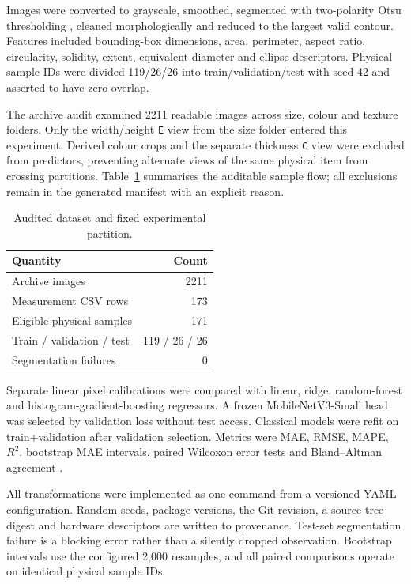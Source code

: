 \documentclass[10pt,twocolumn]{article}
\begin{document}
Images were converted to grayscale, smoothed, segmented with two-polarity Otsu thresholding
\cite{otsu1979threshold}, cleaned morphologically and reduced to the largest valid contour.
Features included bounding-box dimensions, area, perimeter, aspect ratio, circularity, solidity,
extent, equivalent diameter and ellipse descriptors. Physical sample IDs were divided
119/26/26
into train/validation/test with seed 42 and asserted to have zero overlap.

The archive audit examined 2211 readable images across size, colour and texture folders.
Only the width/height \texttt{E} view from the size folder entered this experiment. Derived
colour crops and the separate thickness \texttt{C} view were excluded from predictors,
preventing alternate views of the same physical item from crossing partitions.
Table~\ref{tab:data} summarises the auditable
sample flow; all exclusions remain in the generated manifest with an explicit reason.

\begin{table}[h]
\centering
\caption{Audited dataset and fixed experimental partition.}
\label{tab:data}
\begin{tabular}{lr}
\toprule Quantity & Count \\
\midrule Archive images & 2211 \\
Measurement CSV rows & 173 \\
Eligible physical samples & 171 \\
Train / validation / test & 119 / 26 / 26 \\
Segmentation failures & 0 \\
\bottomrule
\end{tabular}
\end{table}

Separate linear pixel calibrations were compared with linear, ridge, random-forest
\cite{breiman2001random} and histogram-gradient-boosting regressors. A frozen MobileNetV3-Small
\cite{howard2019mobilenetv3} head was selected by validation loss without test access. Classical
models were refit on train+validation after validation selection. Metrics were MAE, RMSE, MAPE,
$R^2$, bootstrap MAE intervals, paired Wilcoxon error tests and Bland--Altman agreement
\cite{bland1986agreement}.

All transformations were implemented as one command from a versioned YAML configuration. Random
seeds, package versions, the Git revision, a source-tree digest and hardware descriptors are
written to provenance. Test-set segmentation failure is a blocking error rather than a silently
dropped observation. Bootstrap intervals use the configured 2,000 resamples, and all paired
comparisons operate on identical physical sample IDs.
\end{document}
